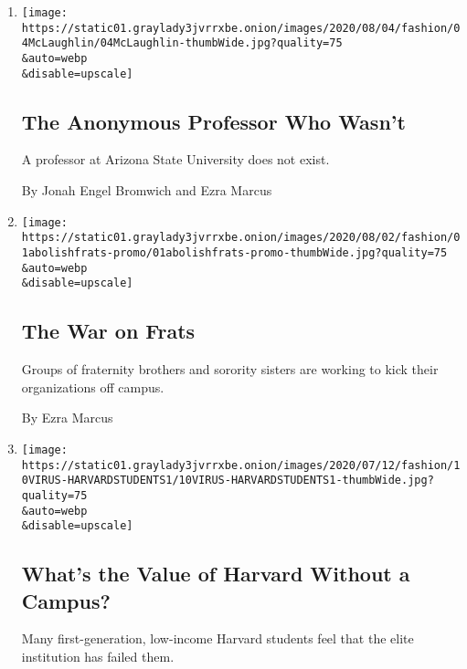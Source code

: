\begin{enumerate}
\def\labelenumi{\arabic{enumi}.}
\item
  \href{/2020/08/04/style/college-coronavirus-hoax.html}{}

  \texttt{[image: https://static01.graylady3jvrrxbe.onion/images/2020/08/04/fashion/04McLaughlin/04McLaughlin-thumbWide.jpg?quality=75\\\&auto=webp\\\&disable=upscale]}

  \hypertarget{the-anonymous-professor-who-wasnt}{%
  \subsection{The Anonymous Professor Who
  Wasn't}\label{the-anonymous-professor-who-wasnt}}

  A professor at Arizona State University does not exist.

  By Jonah Engel Bromwich and Ezra Marcus
\item
  \href{/2020/08/01/style/abolish-greek-life-college-frat-racism.html}{}

  \texttt{[image: https://static01.graylady3jvrrxbe.onion/images/2020/08/02/fashion/01abolishfrats-promo/01abolishfrats-promo-thumbWide.jpg?quality=75\\\&auto=webp\\\&disable=upscale]}

  \hypertarget{the-war-on-frats}{%
  \subsection{The War on Frats}\label{the-war-on-frats}}

  Groups of fraternity brothers and sorority sisters are working to kick
  their organizations off campus.

  By Ezra Marcus
\item
  \href{/2020/07/11/style/harvard-students-coronavirus.html}{}

  \texttt{[image: https://static01.graylady3jvrrxbe.onion/images/2020/07/12/fashion/10VIRUS-HARVARDSTUDENTS1/10VIRUS-HARVARDSTUDENTS1-thumbWide.jpg?quality=75\\\&auto=webp\\\&disable=upscale]}

  \hypertarget{whats-the-value-of-harvard-without-a-campus}{%
  \subsection{What's the Value of Harvard Without a
  Campus?}\label{whats-the-value-of-harvard-without-a-campus}}

  Many first-generation, low-income Harvard students feel that the elite
  institution has failed them.


\end{enumerate}
